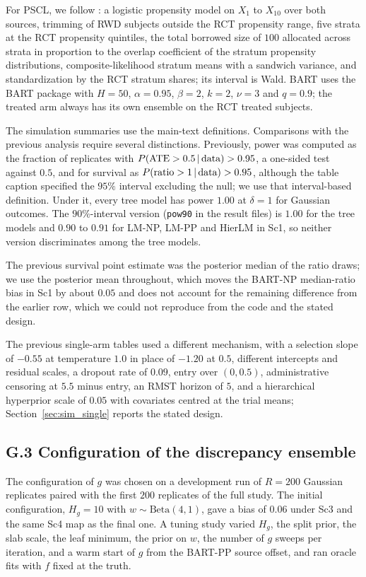 For PSCL, we follow \citet{Chen2020PSCL}: a logistic propensity model on $X_1$ to $X_{10}$ over both sources, trimming of RWD subjects outside the RCT propensity range, five strata at the RCT propensity quintiles, the total borrowed size of $100$ allocated across strata in proportion to the overlap coefficient of the stratum propensity distributions, composite-likelihood stratum means with a sandwich variance, and standardization by the RCT stratum shares; its interval is Wald. BART uses the BART package with $H=50$, $\alpha=0.95$, $\beta=2$, $k=2$, $\nu=3$ and $q=0.9$; the treated arm always has its own ensemble on the RCT treated subjects.

The simulation summaries use the main-text definitions. Comparisons with the previous analysis require several distinctions. Previously, power was computed as the fraction of replicates with $P(\mathrm{ATE}>0.5\,\vert\,\text{data})>0.95$, a one-sided test against $0.5$, and for survival as $P(\text{ratio}>1\,\vert\,\text{data})>0.95$, although the table caption specified the $95\%$ interval excluding the null; we use that interval-based definition. Under it, every tree model has power $1.00$ at $\delta=1$ for Gaussian outcomes. The $90\%$-interval version (\texttt{pow90} in the result files) is $1.00$ for the tree models and $0.90$ to $0.91$ for LM-NP, LM-PP and HierLM in Sc1, so neither version discriminates among the tree models.

The previous survival point estimate was the posterior median of the ratio draws; we use the posterior mean throughout, which moves the BART-NP median-ratio bias in Sc1 by about $0.05$ and does not account for the remaining difference from the earlier row, which we could not reproduce from the code and the stated design.

The previous single-arm tables used a different mechanism, with a selection slope of $-0.55$ at temperature $1.0$ in place of $-1.20$ at $0.5$, different intercepts and residual scales, a dropout rate of $0.09$, entry over $(0,0.5)$, administrative censoring at $5.5$ minus entry, an RMST horizon of $5$, and a hierarchical hyperprior scale of $0.05$ with covariates centred at the trial means; Section~\ref{sec:sim_single} reports the stated design.

\subsection*{G.3 Configuration of the discrepancy ensemble}

The configuration of $g$ was chosen on a development run of $R=200$ Gaussian replicates paired with the first $200$ replicates of the full study. The initial configuration, $H_g=10$ with $w\sim\mathrm{Beta}(4,1)$, gave a bias of $0.06$ under Sc3 and the same Sc4 map as the final one. A tuning study varied $H_g$, the split prior, the slab scale, the leaf minimum, the prior on $w$, the number of $g$ sweeps per iteration, and a warm start of $g$ from the BART-PP source offset, and ran oracle fits with $f$ fixed at the truth.

